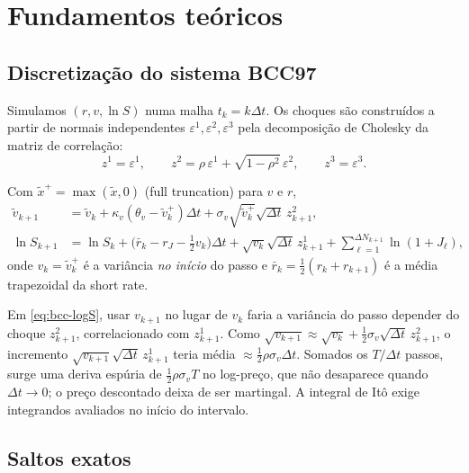 \section{Fundamentos teóricos}

\subsection{Discretização do sistema BCC97}

Simulamos $(r,v,\ln S)$ numa malha $t_k=k\Delta t$. Os choques são construídos a partir de normais independentes $\varepsilon^1,\varepsilon^2,\varepsilon^3$ pela decomposição de Cholesky da matriz de correlação:
\begin{equation}
z^1=\varepsilon^1,\qquad z^2=\rho\,\varepsilon^1+\sqrt{1-\rho^2}\,\varepsilon^2,\qquad z^3=\varepsilon^3.
\end{equation}

\begin{definicao}[Esquema]
Com $\tilde x^+=\max(\tilde x,0)$ (full truncation) para $v$ e $r$,
\begin{align}
\tilde v_{k+1}&=\tilde v_k+\kappa_v(\theta_v-\tilde v_k^+)\Delta t+\sigma_v\sqrt{\tilde v_k^+}\sqrt{\Delta t}\,z^2_{k+1},\\
\ln S_{k+1}&=\ln S_k+\Big(\bar r_k-r_J-\tfrac12v_k\Big)\Delta t+\sqrt{v_k}\sqrt{\Delta t}\,z^1_{k+1}+\sum_{\ell=1}^{\Delta N_{k+1}}\ln(1+J_\ell),\label{eq:bcc-logS}
\end{align}
onde $v_k=\tilde v_k^+$ é a variância \emph{no início} do passo e $\bar r_k=\tfrac12(r_k+r_{k+1})$ é a média trapezoidal da short rate.
\end{definicao}

\begin{observacao}
Em \eqref{eq:bcc-logS}, usar $v_{k+1}$ no lugar de $v_k$ faria a variância do passo depender do choque $z^2_{k+1}$, correlacionado com $z^1_{k+1}$. Como $\sqrt{v_{k+1}}\approx\sqrt{v_k}+\tfrac12\sigma_v\sqrt{\Delta t}\,z^2_{k+1}$, o incremento $\sqrt{v_{k+1}}\sqrt{\Delta t}\,z^1_{k+1}$ teria média $\approx\tfrac12\rho\sigma_v\Delta t$. Somados os $T/\Delta t$ passos, surge uma deriva espúria de $\tfrac12\rho\sigma_vT$ no log-preço, que não desaparece quando $\Delta t\to0$; o preço descontado deixa de ser martingal. A integral de Itô exige integrandos avaliados no início do intervalo.
\end{observacao}

\subsection{Saltos exatos}

